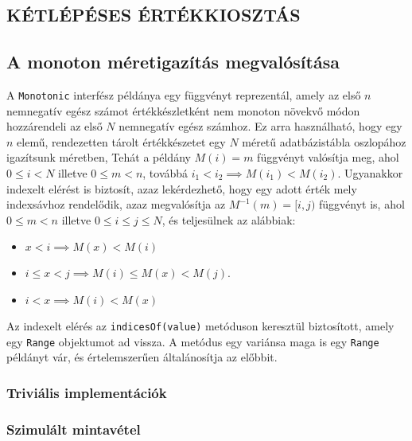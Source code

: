 \documentclass[
    parspace,
    noindent,
    nohyp,
]{elteiktdk}[2023/04/10]
\begin{document}
\subsection{KÉTLÉPÉSES ÉRTÉKKIOSZTÁS}

\subsection{A monoton méretigazítás megvalósítása}

A \texttt{Monotonic} interfész példánya egy függvényt reprezentál,
amely az első $n$ nemnegatív egész számot értékkészletként nem monoton növekvő módon hozzárendeli az első $N$ nemnegatív egész számhoz.
Ez arra használható, hogy egy $n$ elemű, rendezetten tárolt értékkészetet egy $N$ méretű adatbázistábla oszlopához igazítsunk méretben,
Tehát a példány $M(i) = m$ függvényt valósítja meg, ahol $0 \leq i < N$ illetve $0 \leq m < n$, továbbá $i_1 < i_2 \implies M(i_1) < M(i_2)$.
Ugyanakkor indexelt elérést is biztosít, azaz lekérdezhető, hogy egy adott érték mely indexsávhoz rendelődik,
azaz megvalósítja az $M^{-1}(m) = [i, j)$ függvényt is, ahol $0 \leq m < n$ illetve $0 \leq i \leq j \leq N$, és teljesülnek az alábbiak:

\begin{itemize}
\item $x < i \implies M(x) < M(i)$
\item $i \leq x < j \implies M(i) \leq M(x) < M(j)$.
\item $i < x \implies M(i) < M(x)$
\end{itemize}

Az indexelt elérés az \texttt{indicesOf(value)} metóduson keresztül biztosított, amely egy \texttt{Range} objektumot ad vissza.
A metódus egy variánsa maga is egy \texttt{Range} példányt vár, és értelemszerűen általánosítja az előbbit.

\subsubsection{Triviális implementációk}



\subsubsection{Szimulált mintavétel}
\end{document}
